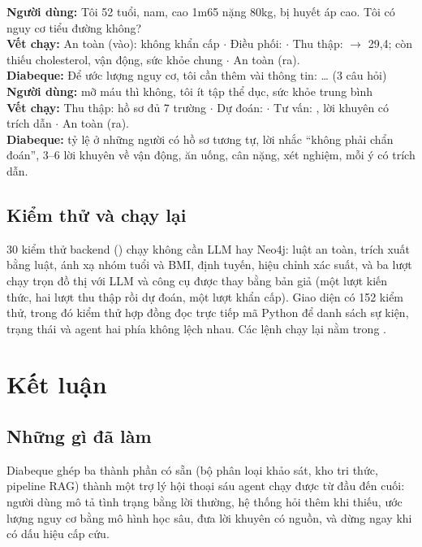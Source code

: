 \documentclass[11pt,a4paper]{article}
\begin{document}
\begin{plainbox}
\small\raggedright
\textbf{Người dùng:} Tôi 52 tuổi, nam, cao 1m65 nặng 80kg, bị huyết áp cao. Tôi có nguy cơ tiểu đường không?\\
\textbf{Vết chạy:} An toàn (vào): không khẩn cấp $\cdot$ Điều phối:  $\cdot$ Thu thập:  $\to$ 29,4;
còn thiếu cholesterol, vận động, sức khỏe chung $\cdot$ An toàn (ra).\\
\textbf{Diabeque:} Để ước lượng nguy cơ, tôi cần thêm vài thông tin: \dots{} (3 câu hỏi)\\[4pt]
\textbf{Người dùng:} mỡ máu thì không, tôi ít tập thể dục, sức khỏe trung bình\\
\textbf{Vết chạy:} Thu thập: hồ sơ đủ 7 trường $\cdot$ Dự đoán:  $\cdot$ Tư vấn: , lời
khuyên có trích dẫn $\cdot$ An toàn (ra).\\
\textbf{Diabeque:} tỷ lệ ở những người có hồ sơ tương tự, lời nhắc “không phải chẩn đoán”, 3--6 lời khuyên về vận động, ăn
uống, cân nặng, xét nghiệm, mỗi ý có trích dẫn.
\end{plainbox}

\subsection{Kiểm thử và chạy lại}

30 kiểm thử backend () chạy không cần LLM hay Neo4j: luật an toàn, trích xuất bằng luật, ánh xạ
nhóm tuổi và BMI, định tuyến, hiệu chỉnh xác suất, và ba lượt chạy trọn đồ thị với LLM và công cụ được thay bằng bản giả
(một lượt kiến thức, hai lượt thu thập rồi dự đoán, một lượt khẩn cấp). Giao diện có 152 kiểm thử, trong đó kiểm thử hợp đồng
đọc trực tiếp mã Python để danh sách sự kiện, trạng thái và agent hai phía không lệch nhau. Các lệnh chạy lại nằm trong
.

\section{Kết luận}

\subsection{Những gì đã làm}

Diabeque ghép ba thành phần có sẵn (bộ phân loại khảo sát, kho tri thức, pipeline RAG) thành một trợ lý hội thoại sáu agent
chạy được từ đầu đến cuối: người dùng mô tả tình trạng bằng lời thường, hệ thống hỏi thêm khi thiếu, ước lượng nguy cơ bằng
mô hình học sâu, đưa lời khuyên có nguồn, và dừng ngay khi có dấu hiệu cấp cứu.
\end{document}
